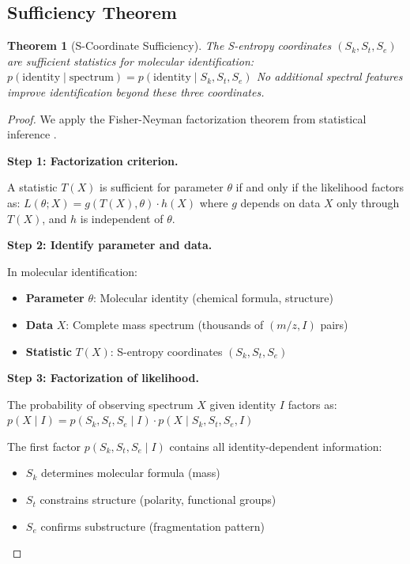 \documentclass[twocolumn,10pt]{article}
\newtheorem{theorem}{Theorem}[section]
\begin{document}
\subsection{Sufficiency Theorem}

\begin{theorem}[S-Coordinate Sufficiency]
\label{thm:sufficient}
The S-entropy coordinates $(S_k, S_t, S_e)$ are \emph{sufficient statistics} for molecular identification:
$
p(\text{identity} \mid \text{spectrum}) = p(\text{identity} \mid S_k, S_t, S_e)
$
No additional spectral features improve identification beyond these three coordinates.
\end{theorem}

\begin{proof}
We apply the Fisher-Neyman factorization theorem from statistical inference \citep{cover2006elements}.

\textbf{Step 1: Factorization criterion.}

A statistic $T(X)$ is sufficient for parameter $\theta$ if and only if the likelihood factors as:
$
L(\theta; X) = g(T(X), \theta) \cdot h(X)
$
where $g$ depends on data $X$ only through $T(X)$, and $h$ is independent of $\theta$.

\textbf{Step 2: Identify parameter and data.}

In molecular identification:
\begin{itemize}
    \item \textbf{Parameter} $\theta$: Molecular identity (chemical formula, structure)
    \item \textbf{Data} $X$: Complete mass spectrum (thousands of $(m/z, I)$ pairs)
    \item \textbf{Statistic} $T(X)$: S-entropy coordinates $(S_k, S_t, S_e)$
\end{itemize}

\textbf{Step 3: Factorization of likelihood.}

The probability of observing spectrum $X$ given identity $I$ factors as:
$
p(X \mid I) = p(S_k, S_t, S_e \mid I) \cdot p(X \mid S_k, S_t, S_e, I)
$

The first factor $p(S_k, S_t, S_e \mid I)$ contains all identity-dependent information:
\begin{itemize}
    \item $S_k$ determines molecular formula (mass)
    \item $S_t$ constrains structure (polarity, functional groups)
    \item $S_e$ confirms substructure (fragmentation pattern)
\end{itemize}


\end{proof}
\end{document}

